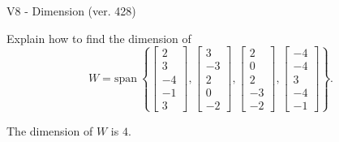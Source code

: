 \begin{exercise}
  \begin{exerciseTitle}V8 - Dimension (ver. 428)\end{exerciseTitle}
  \begin{exerciseStatement}
    Explain how to find the dimension of 
\[W=\mathrm{span}\ \left\{\left[\begin{array}{r}
2 \\
3 \\
-4 \\
-1 \\
3
\end{array}\right] , \left[\begin{array}{r}
3 \\
-3 \\
2 \\
0 \\
-2
\end{array}\right] , \left[\begin{array}{r}
2 \\
0 \\
2 \\
-3 \\
-2
\end{array}\right] , \left[\begin{array}{r}
-4 \\
-4 \\
3 \\
-4 \\
-1
\end{array}\right]\right\}.\]



  \end{exerciseStatement}
  \begin{exerciseAnswer}
   The dimension of \(W\) is  \(4\).
  


  \end{exerciseAnswer}
\end{exercise}